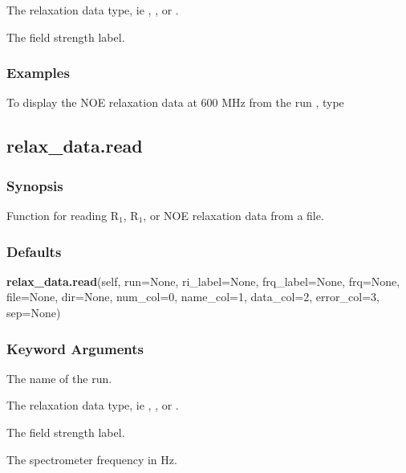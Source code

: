    The relaxation data type, ie , , or .   

   The field strength label.  

  

  
 \subsubsection{Examples} 

 To display the NOE relaxation data at 600 MHz from the run , type 
  


  

 \newpage 

 \subsection{relax\_data.read} 

  
 \subsubsection{Synopsis} 

 Function for reading R$_1$, R$_1$, or NOE relaxation data from a file. 
  

  
 \subsubsection{Defaults} 

 \textsf{\textbf{relax\_data.read}(self, run=None, ri\_label=None, frq\_label=None, frq=None, file=None, dir=None, num\_col=0, name\_col=1, data\_col=2, error\_col=3, sep=None)} 

  
 \subsubsection{Keyword Arguments} 

   The name of the run.   

   The relaxation data type, ie , , or .   

   The field strength label.   

   The spectrometer frequency in Hz.   

